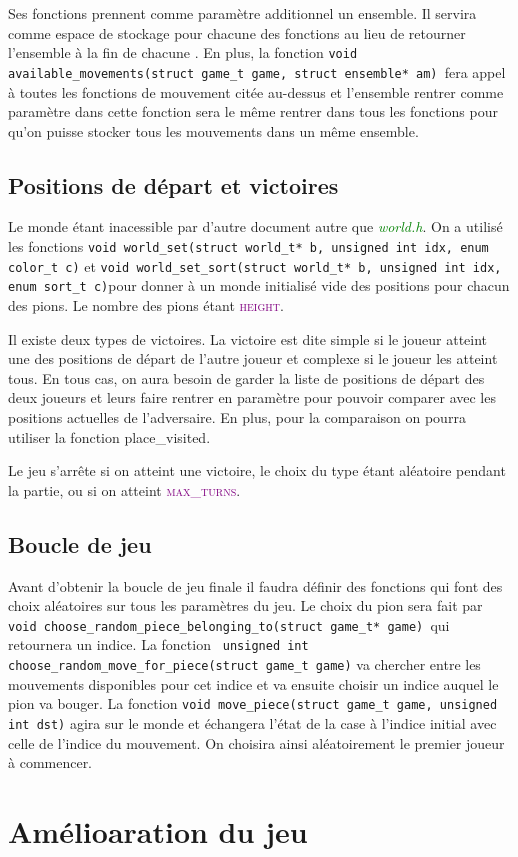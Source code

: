 \documentclass[a4paper]{article}
\begin{document}
Ses fonctions prennent comme paramètre additionnel un ensemble. Il servira comme espace de stockage pour chacune des fonctions au lieu de retourner l’ensemble à la fin de chacune . En plus, la fonction \lstinline|void available_movements(struct game_t game, struct ensemble* am) |fera appel à toutes les fonctions de mouvement citée au-dessus et l’ensemble rentrer comme paramètre dans cette fonction sera le même rentrer dans tous les fonctions pour qu’on puisse stocker tous les mouvements dans un même ensemble.  
\subsection{Positions de départ et victoires}
Le monde étant inacessible par d’autre document autre que \textcolor{green}{\textit{world.h}}. On a utilisé les fonctions \lstinline|void world_set(struct world_t* b, unsigned int idx, enum color_t c)| et \lstinline|void world_set_sort(struct world_t* b, unsigned int idx, enum sort_t c)|pour donner à un monde initialisé vide des positions pour chacun des pions. Le nombre des pions étant \textcolor{purple}{\textsc{height}}.  

Il existe deux types de victoires. La victoire est dite simple si le joueur atteint une des positions de départ de l’autre joueur et complexe si le joueur les atteint tous. En tous cas, on aura besoin de garder la liste de positions de départ des deux joueurs et leurs faire rentrer en paramètre pour pouvoir comparer avec les positions actuelles de l’adversaire. En plus, pour la comparaison on pourra utiliser la fonction place\_visited. 

Le jeu s’arrête si on atteint une victoire, le choix du type étant aléatoire pendant la partie, ou si on atteint \textcolor{purple}{\textsc{max\_turns}}. 
\subsection{Boucle de jeu}
Avant d’obtenir la boucle de jeu finale il faudra définir des fonctions qui font des choix aléatoires sur tous les paramètres du jeu. 
Le choix du pion sera fait par \lstinline|void choose_random_piece_belonging_to(struct game_t* game) |qui retournera un indice. La fonction \lstinline| unsigned int choose_random_move_for_piece(struct game_t game)| va chercher entre les mouvements disponibles pour cet indice et va ensuite choisir un indice auquel le pion va bouger. La fonction \lstinline|void move_piece(struct game_t game, unsigned int dst)| agira sur le monde et échangera l’état de la case à l’indice initial avec celle de l’indice du mouvement. On choisira ainsi aléatoirement le premier joueur à commencer. 
\section{Amélioaration du jeu}
\end{document}
